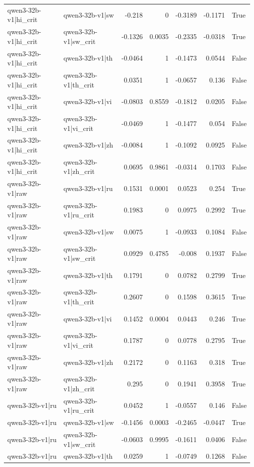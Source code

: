 \begin{table}
\begin{tabular}{l l r r r r l}
qwen3-32b-v1|hi_crit & qwen3-32b-v1|sw & -0.218 & 0 & -0.3189 & -0.1171 & True \\
qwen3-32b-v1|hi_crit & qwen3-32b-v1|sw_crit & -0.1326 & 0.0035 & -0.2335 & -0.0318 & True \\
qwen3-32b-v1|hi_crit & qwen3-32b-v1|th & -0.0464 & 1 & -0.1473 & 0.0544 & False \\
qwen3-32b-v1|hi_crit & qwen3-32b-v1|th_crit & 0.0351 & 1 & -0.0657 & 0.136 & False \\
qwen3-32b-v1|hi_crit & qwen3-32b-v1|vi & -0.0803 & 0.8559 & -0.1812 & 0.0205 & False \\
qwen3-32b-v1|hi_crit & qwen3-32b-v1|vi_crit & -0.0469 & 1 & -0.1477 & 0.054 & False \\
qwen3-32b-v1|hi_crit & qwen3-32b-v1|zh & -0.0084 & 1 & -0.1092 & 0.0925 & False \\
qwen3-32b-v1|hi_crit & qwen3-32b-v1|zh_crit & 0.0695 & 0.9861 & -0.0314 & 0.1703 & False \\
qwen3-32b-v1|raw & qwen3-32b-v1|ru & 0.1531 & 0.0001 & 0.0523 & 0.254 & True \\
qwen3-32b-v1|raw & qwen3-32b-v1|ru_crit & 0.1983 & 0 & 0.0975 & 0.2992 & True \\
qwen3-32b-v1|raw & qwen3-32b-v1|sw & 0.0075 & 1 & -0.0933 & 0.1084 & False \\
qwen3-32b-v1|raw & qwen3-32b-v1|sw_crit & 0.0929 & 0.4785 & -0.008 & 0.1937 & False \\
qwen3-32b-v1|raw & qwen3-32b-v1|th & 0.1791 & 0 & 0.0782 & 0.2799 & True \\
qwen3-32b-v1|raw & qwen3-32b-v1|th_crit & 0.2607 & 0 & 0.1598 & 0.3615 & True \\
qwen3-32b-v1|raw & qwen3-32b-v1|vi & 0.1452 & 0.0004 & 0.0443 & 0.246 & True \\
qwen3-32b-v1|raw & qwen3-32b-v1|vi_crit & 0.1787 & 0 & 0.0778 & 0.2795 & True \\
qwen3-32b-v1|raw & qwen3-32b-v1|zh & 0.2172 & 0 & 0.1163 & 0.318 & True \\
qwen3-32b-v1|raw & qwen3-32b-v1|zh_crit & 0.295 & 0 & 0.1941 & 0.3958 & True \\
qwen3-32b-v1|ru & qwen3-32b-v1|ru_crit & 0.0452 & 1 & -0.0557 & 0.146 & False \\
qwen3-32b-v1|ru & qwen3-32b-v1|sw & -0.1456 & 0.0003 & -0.2465 & -0.0447 & True \\
qwen3-32b-v1|ru & qwen3-32b-v1|sw_crit & -0.0603 & 0.9995 & -0.1611 & 0.0406 & False \\
qwen3-32b-v1|ru & qwen3-32b-v1|th & 0.0259 & 1 & -0.0749 & 0.1268 & False \\

\end{tabular}
\end{table}
